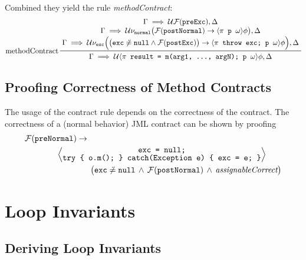 		Combined they yield the rule \textit{methodContract}:
		\begin{equation*}
			\prftree[l]
			{methodContract}
			{\let\scriptstyle\textstyle \substack{
					\Gamma \implies \mathcal{U} \mathcal{F}(\texttt{preExc}), \Delta \\
					\Gamma \implies \mathcal{U} \nu_\texttt{normal} \big( \mathcal{F}(\texttt{postNormal}) \to \langle \pi \texttt{ p } \omega \rangle \phi \big), \Delta \\
					\Gamma \implies \mathcal{U} \nu_\texttt{exc} \Big( \big( \texttt{exc} \not\doteq \texttt{null} \land \mathcal{F}(\texttt{postExc}) \big) \to \langle \pi \texttt{ throw exc; p } \omega \rangle \phi \Big), \Delta}}
			{\Gamma \implies \mathcal{U} \langle \pi \texttt{ result = m(arg1, ..., argN); p } \omega \rangle \phi, \Delta}
		\end{equation*}

	\subsection{Proofing Correctness of Method Contracts}
		The usage of the contract rule depends on the correctness of the contract. The correctness of a (normal behavior) JML contract can be shown by proofing
		\begin{align*}
			 & \mathcal{F}(\texttt{preNormal}) \to                                                                                                                        \\
			 & \qquad\qquad \Big\langle { \let\scriptstyle\textstyle \substack{\texttt{exc = null;}                                                                       \\ \texttt{try \{ o.m(); \} catch(Exception e) \{ exc = e; \}}} } \Big\rangle \\
			 & \qquad\qquad\qquad\qquad \big( \texttt{exc} \not\doteq \texttt{null} \,\land\, \mathcal{F}(\texttt{postNormal}) \,\land\, \textit{assignableCorrect} \big)
		\end{align*}

\section{Loop Invariants} %
	\label{sec:dlLoopInv}


	\subsection{Deriving Loop Invariants} %

